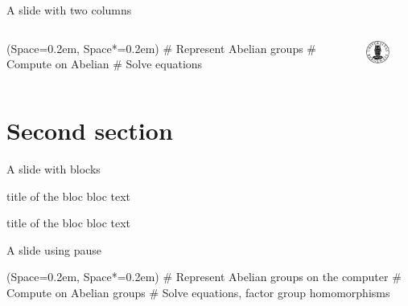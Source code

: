 \documentclass[12pt, aspectratio=149]{beamer}
\newcommand{\listSpace}{0.2em}
\theoremstyle{plain}
\begin{document}
\begin{frame}[fragile]{A slide with two columns}
\begin{columns}
\begin{column}{0.5\textwidth}
	\begin{easylist}[itemize]
		\ListProperties(Space=\listSpace, Space*=\listSpace)
		# Represent Abelian groups
		# Compute on Abelian
		# Solve equations
	\end{easylist}
\end{column}
\begin{column}{0.5\textwidth}
    \begin{center}
     \includegraphics[width=0.5\textwidth]{figs/UiB_logo.pdf}
     \end{center}
\end{column}
\end{columns}
\end{frame}

\section{Second section}
\begin{frame}[fragile]{A slide with blocks}
	\begin{block}{title of the bloc}
	bloc text
	\end{block}
	
	\begin{exampleblock}{title of the bloc}
	bloc text
	\end{exampleblock}
\end{frame}

\begin{frame}[fragile]{A slide using pause}
	\begin{easylist}[itemize]
		\ListProperties(Space=\listSpace, Space*=\listSpace)
		# Represent Abelian groups on the computer \pause
		# Compute on Abelian groups \pause
		# Solve equations, factor group homomorphisms
	\end{easylist}
\end{frame}
\end{document}

